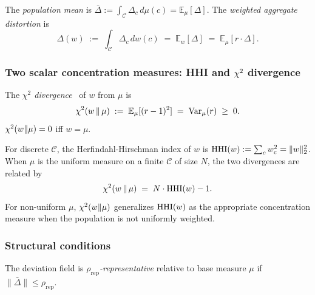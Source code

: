 The \emph{population mean} is $\bar\Delta := \int_\mathcal{C}
\Delta_c \,d\mu(c) = \mathbb{E}_\mu[\Delta]$. The \emph{weighted
aggregate distortion} is
\begin{equation}
\label{eq:aggregate-distortion-companion}
  \Delta(w) \;:=\; \int_\mathcal{C} \Delta_c \,dw(c)
  \;=\; \mathbb{E}_w[\Delta] \;=\; \mathbb{E}_\mu[r \cdot \Delta].
\end{equation}

\subsubsection{Two scalar concentration measures: HHI and $\chi^2$ divergence}

\begin{definition}
\label{def:chisq-companion}
The \emph{$\chi^2$ divergence}~\citep{kullback1951information}
of $w$ from $\mu$ is
\begin{equation}
\label{eq:chisq-companion}
  \chi^2(w \,\|\, \mu) \;:=\; \mathbb{E}_\mu[(r - 1)^2]
  \;=\; \mathrm{Var}_\mu(r) \;\geq\; 0.
\end{equation}
$\chi^2(w \|\mu) = 0$ iff $w = \mu$.
\end{definition}

\begin{definition}
\label{def:hhi-companion}
For discrete $\mathcal{C}$, the Herfindahl-Hirschman index of
$w$ is $\mathrm{HHI}(w) := \sum_c w_c^2 = \|w\|_2^2$. When $\mu$ is the
uniform measure on a finite $\mathcal{C}$ of size $N$, the two
divergences are related by
\begin{equation}
\label{eq:chisq-hhi-companion}
  \chi^2(w \,\|\, \mu) \;=\; N \cdot \mathrm{HHI}(w) - 1.
\end{equation}
For non-uniform $\mu$, $\chi^2(w \|\mu)$ generalizes $\mathrm{HHI}(w)$ as
the appropriate concentration measure when the population is not
uniformly weighted.
\end{definition}

\subsubsection{Structural conditions}

\begin{definition}
\label{def:rep-companion}
The deviation field is \emph{$\rho_\mathrm{rep}$-representative}
relative to base measure $\mu$ if $\|\bar\Delta\| \leq
\rho_\mathrm{rep}$.
\end{definition}

